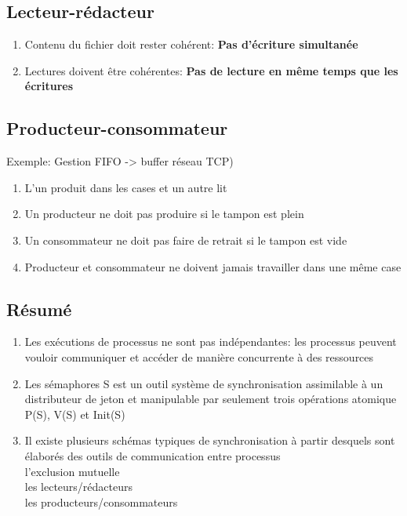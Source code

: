\subsection{Lecteur-rédacteur}
\begin{enumerate}
\item Contenu du fichier doit rester cohérent: \textbf{Pas d'écriture simultanée}
\item Lectures doivent être cohérentes: \textbf{Pas de lecture en même temps que les écritures}
\end{enumerate}

\subsection{Producteur-consommateur}
Exemple: Gestion FIFO -> buffer réseau TCP)
\begin{enumerate}
\item L'un produit dans les cases et un autre lit
\item Un producteur ne doit pas produire si le tampon est plein
\item Un consommateur ne doit pas faire de retrait si le tampon est vide
\item Producteur et consommateur ne doivent jamais travailler dans une même case
\end{enumerate}

\subsection{Résumé}
\begin{enumerate}
\item Les exécutions de processus ne sont pas indépendantes: les processus peuvent vouloir communiquer et accéder de manière concurrente à des ressources 
\item Les sémaphores S est un outil système de synchronisation assimilable à un distributeur de jeton et manipulable par seulement trois opérations atomique P(S), V(S) et Init(S)
\item Il existe plusieurs schémas typiques de synchronisation à partir desquels sont élaborés des outils de communication entre processus\\
l'exclusion mutuelle\\
les lecteurs/rédacteurs\\
les producteurs/consommateurs
\end{enumerate}

